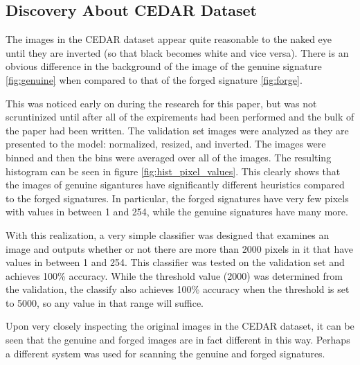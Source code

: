 \subsection{Discovery About CEDAR Dataset}\label{sec:cedar_flaw}
The images in the CEDAR dataset appear quite reasonable to the naked eye until they are inverted (so that black becomes white and vice versa).
There is an obvious difference in the background of the image of the genuine signature \ref{fig:genuine} when compared to that of the forged signature \ref{fig:forge}.

This was noticed early on during the research for this paper, but was not scruntinized until after all of the expirements had been performed and the bulk of the paper had been written.
The validation set images were analyzed as they are presented to the model: normalized, resized, and inverted.
The images were binned and then the bins were averaged over all of the images.
The resulting histogram can be seen in figure \ref{fig:hist_pixel_values}.
This clearly shows that the images of genuine sigantures have significantly different heuristics compared to the forged signatures.
In particular, the forged signatures have very few pixels with values in between 1 and 254, while the genuine signatures have many more.

With this realization, a very simple classifier was designed that examines an image and outputs whether or not there are more than 2000 pixels in it that have values in between 1 and 254.
This classifier was tested on the validation set and achieves 100\% accuracy.
While the threshold value (2000) was determined from the validation, the classify also achieves 100\% accuracy when the threshold is set to 5000, so any value in that range will suffice.

Upon very closely inspecting the original images in the CEDAR dataset, it can be seen that the genuine and forged images are in fact different in this way.
Perhaps a different system was used for scanning the genuine and forged signatures.
